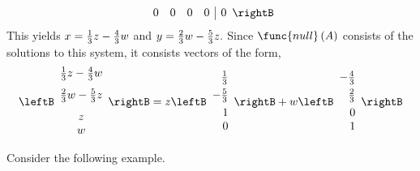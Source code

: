 \begin{solution}
\begin{equation*}
\begin{array}{rrrr|r}
0 & 0 & 0 & 0 & 0
\end{array}
\rightB 
\end{equation*}
This yields $x=\vspace{0.05in}\frac{1}{3}z-\vspace{0.05in}\frac{4}{3}w$ and 
$y=\vspace{0.05in}\frac{2}{3}w-\vspace{0.05in}\frac{5}{3}z.$
Since $\func{null} \left( A\right) $ consists of the solutions to this system, it consists vectors of the form,
\begin{equation*}
\leftB
\begin{array}{c}
\vspace{0.05in}\frac{1}{3}z-\vspace{0.05in}\frac{4}{3}w \\
\vspace{0.05in}\frac{2}{3}w-\vspace{0.05in}\frac{5}{3}z \\
z \\
w
\end{array}
\rightB =z \leftB
\begin{array}{r}
\vspace{0.05in}\frac{1}{3} \\
-\vspace{0.05in}\frac{5}{3} \\
1 \\
0
\end{array}
\rightB +w \leftB
\begin{array}{r}
-\vspace{0.05in}\frac{4}{3} \\
\vspace{0.05in}\frac{2}{3} \\
0 \\
1
\end{array}
\rightB 
\end{equation*}
\end{solution}

Consider the following example.


